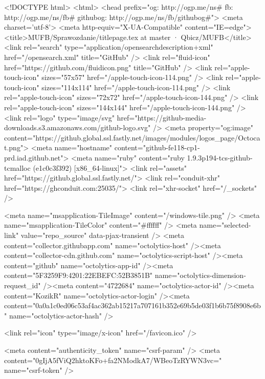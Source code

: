 


<!DOCTYPE html>
<html>
  <head prefix="og: http://ogp.me/ns# fb: http://ogp.me/ns/fb# githubog: http://ogp.me/ns/fb/githubog#">
    <meta charset='utf-8'>
    <meta http-equiv="X-UA-Compatible" content="IE=edge">
        <title>MUFB/Sprawozdanie/titlepage.tex at master · Qbicz/MUFB</title>
    <link rel="search" type="application/opensearchdescription+xml" href="/opensearch.xml" title="GitHub" />
    <link rel="fluid-icon" href="https://github.com/fluidicon.png" title="GitHub" />
    <link rel="apple-touch-icon" sizes="57x57" href="/apple-touch-icon-114.png" />
    <link rel="apple-touch-icon" sizes="114x114" href="/apple-touch-icon-114.png" />
    <link rel="apple-touch-icon" sizes="72x72" href="/apple-touch-icon-144.png" />
    <link rel="apple-touch-icon" sizes="144x144" href="/apple-touch-icon-144.png" />
    <link rel="logo" type="image/svg" href="https://github-media-downloads.s3.amazonaws.com/github-logo.svg" />
    <meta property="og:image" content="https://github.global.ssl.fastly.net/images/modules/logos_page/Octocat.png">
    <meta name="hostname" content="github-fe118-cp1-prd.iad.github.net">
    <meta name="ruby" content="ruby 1.9.3p194-tcs-github-tcmalloc (e1c0c3f392) [x86_64-linux]">
    <link rel="assets" href="https://github.global.ssl.fastly.net/">
    <link rel="conduit-xhr" href="https://ghconduit.com:25035/">
    <link rel="xhr-socket" href="/_sockets" />
    


    <meta name="msapplication-TileImage" content="/windows-tile.png" />
    <meta name="msapplication-TileColor" content="#ffffff" />
    <meta name="selected-link" value="repo_source" data-pjax-transient />
    <meta content="collector.githubapp.com" name="octolytics-host" /><meta content="collector-cdn.github.com" name="octolytics-script-host" /><meta content="github" name="octolytics-app-id" /><meta content="5F3259F9:4201:22EBEFC:52B3851B" name="octolytics-dimension-request_id" /><meta content="4722684" name="octolytics-actor-id" /><meta content="KozikR" name="octolytics-actor-login" /><meta content="0a0a1c0ed06c53af4ac362ab15217a707161b352e69b5de03f1b6b75f8908e6b" name="octolytics-actor-hash" />
    

    
    
    <link rel="icon" type="image/x-icon" href="/favicon.ico" />

    <meta content="authenticity_token" name="csrf-param" />
<meta content="0gIjA5fViQ2hktoKFo+fa2NModkA7/WBeoTzRYWN3vc=" name="csrf-token" />

